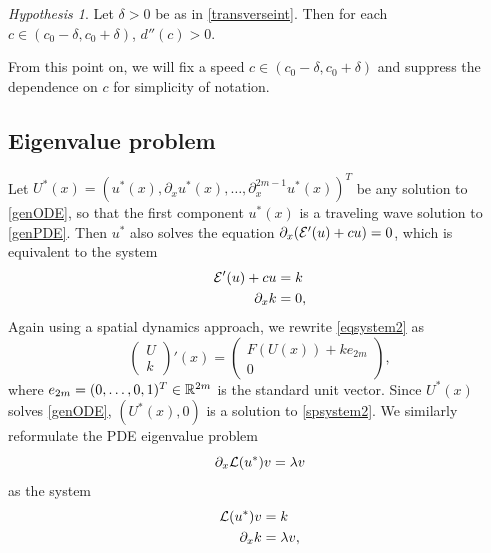 \documentclass[10pt,reqno]{amsart}
\theoremstyle{plain}
\theoremstyle{definition}
\theoremstyle{remark}
\newtheorem{hypothesis}[theorem]{Hypothesis}
\numberwithin{theorem}{section}
\numberwithin{equation}{section}
\begin{document}
\begin{hypothesis}\label{hyp:dccpos}
Let $\delta > 0$ be as in \cref{transverseint}. Then for each $c \in (c_0 - \delta, c_0 + \delta)$, $d''(c) > 0$.
\end{hypothesis}

\noi From this point on, we will fix a speed $c \in (c_0 - \delta, c_0 + \delta)$ and suppress the dependence on $c$ for simplicity of notation.

\subsection{Eigenvalue problem}\label{sec:EVP}

Let $U^*(x) = (u^*(x), \partial_x u^*(x), \dots, \partial_x^{2m-1}u^*(x) )^T$ be any solution to \cref{genODE}, so that the first component $u^*(x)$ is a traveling wave solution to \cref{genPDE}. Then $u^*$ also solves the equation $\partial_x(\mathcal{E}'(u) + cu) = 0$, which is equivalent to the system
\begin{equation}\label{eqsystem2}
\begin{aligned}
\mathcal{E}'(u) + cu &= k \\
\partial_x k &= 0,
\end{aligned}
\end{equation}
Again using a spatial dynamics approach, we rewrite \cref{eqsystem2} as
\begin{equation}\label{spsystem2}
\begin{pmatrix}
U \\ k
\end{pmatrix}'(x) =
\begin{pmatrix} 
F(U(x)) + k e_{2m} \\ 0
\end{pmatrix},
\end{equation}
where $e_{2m} = (0, \dots, 0, 1)^T \in \mathbb{R}^{2m}$ is the standard unit vector. Since $U^*(x)$ solves \cref{genODE}, $(U^*(x), 0)$ is a solution to \cref{spsystem2}. We similarly reformulate the PDE eigenvalue problem 
\begin{equation}\label{genPDEeig}
\partial_x \mathcal{L}(u^*) v = \lambda v
\end{equation}
as the system
\begin{equation}\label{genPDEeig2}
\begin{aligned}
\mathcal{L}(u^*) v &= k \\
\partial_x k &= \lambda v,
\end{aligned}
\end{equation}
\end{document}
